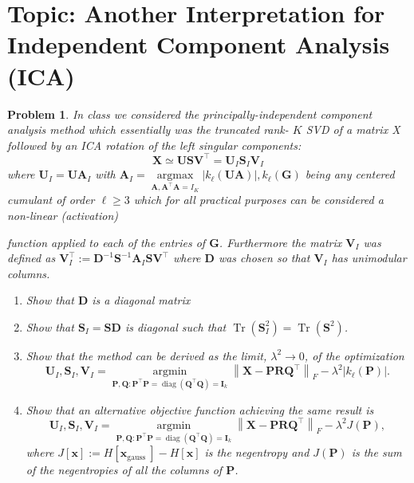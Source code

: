 \documentclass[11pt]{article}
\theoremstyle{plain} %
\newtheorem{problem}[theorem]{Problem}
\theoremstyle{remark}
\begin{document}
\section{Topic: Another Interpretation for Independent Component Analysis (ICA)}
\begin{problem}
In class we considered the principally-independent component analysis method
which essentially was the truncated rank- $K$ SVD of a matrix X followed by an
ICA rotation of the left singular components:
$$
  \mathbf{X} \simeq \mathbf{U S V}^\top=\mathbf{U}_I \mathbf{S}_I \mathbf{V}_I
$$
where $\mathbf{U}_I=\mathbf{U} \mathbf{A}_I$ with
$\mathbf{A}_I=\underset{\mathbf{A}, \mathbf{A}^\top
    \mathbf{A}=I_K}{\operatorname{argmax}}\left|k_{\ell}(\mathbf{U A})\right|,
  k_{\ell}(\mathbf{G})$ being any centered cumulant of order $\ell \geq 3$ which
for all practical purposes can be considered a non-linear (activation)

function applied to each of the entries of $\mathbf{G}$. Furthermore the matrix
$\mathbf{V}_I$ was defined as $\mathbf{V}_I^\top:=\mathbf{D}^{-1}
  \mathbf{S}^{-1} \mathbf{A}_I \mathbf{S} \mathbf{V}^\top$ where $\mathbf{D}$
was chosen so that $\mathbf{V}_I$ has unimodular columns.
\begin{enumerate}[label=(\alph*)]
  \item Show that $\mathbf{D}$ is a diagonal matrix
  \item Show that $\mathbf{S}_I=\mathbf{S D}$ is diagonal such that
        $\operatorname{Tr}\left(\mathbf{S}_I^2\right)=\operatorname{Tr}\left(\mathbf{S}^2\right)$.
  \item Show that the method can be derived as the limit, $\lambda^2 \rightarrow
          0$, of the optimization
        $$
          \mathbf{U}_I, \mathbf{S}_I, \mathbf{V}_I=\underset{\mathbf{P}, \mathbf{Q}: \mathbf{P}^\top \mathbf{P}=\operatorname{diag}\left(\mathbf{Q}^\top \mathbf{Q}\right)=\mathbf{I}_k}{\operatorname{argmin}}\left\|\mathbf{X}-\mathbf{P R Q}^\top\right\|_F-\lambda^2\left|k_{\ell}(\mathbf{P})\right| .
        $$
  \item Show that an alternative objective function achieving the same result is
        $$
          \mathbf{U}_I, \mathbf{S}_I, \mathbf{V}_I=\underset{\mathbf{P}, \mathbf{Q}: \mathbf{P}^\top \mathbf{P}=\operatorname{diag}\left(\mathbf{Q}^\top \mathbf{Q}\right)=\mathbf{I}_k}{\operatorname{argmin}}\left\|\mathbf{X}-\mathbf{P R Q}^\top\right\|_F-\lambda^2 J(\mathbf{P}),
        $$
        where $J[\mathbf{x}]:=H\left[\mathbf{x}_{\text {gauss
          }}\right]-H[\mathbf{x}]$ is the negentropy and $J(\mathbf{P})$ is the
        sum of the negentropies of all the columns of $\mathbf{P}$.
\end{enumerate}
\end{problem}
\end{document}
